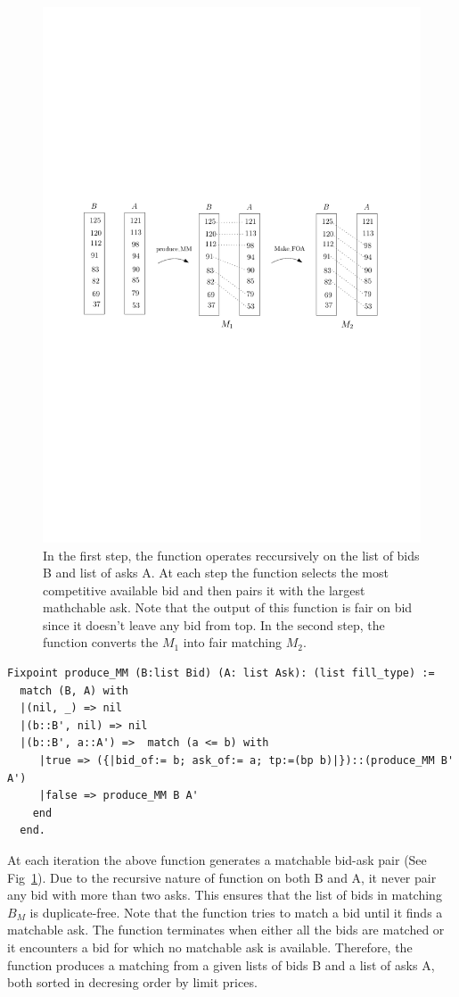 \documentclass[a4paper,UKenglish,cleveref, autoref]{lipics-v2019}
\begin{document}
\begin{figure}[h!]
\centering
\includegraphics[width=.8\textwidth]{MM.pdf}
\caption{In the first step, the function  operates reccursively on the list of bids B and list of asks A. At each step the function  selects the most competitive available bid and then pairs it with the largest mathchable ask. Note that the output of this function is fair on bid since it doesn't leave any bid from top. In the second step, the function  converts the $M_1$ into fair matching $M_2$. }
\label{fig:mm}
\end{figure}

\begin{verbatim}
Fixpoint produce_MM (B:list Bid) (A: list Ask): (list fill_type) :=
  match (B, A) with
  |(nil, _) => nil
  |(b::B', nil) => nil              
  |(b::B', a::A') =>  match (a <= b) with
     |true => ({|bid_of:= b; ask_of:= a; tp:=(bp b)|})::(produce_MM B' A')
     |false => produce_MM B A'
    end
  end. 
\end{verbatim}

At each iteration the above function generates a matchable bid-ask pair (See Fig~\ref{fig:mm}). Due to the recursive nature of  function   on both B and A, it never pair any bid with more than two asks. This ensures that the list of bids in matching $B_M$ is duplicate-free. Note that the function  tries to match a bid until it finds a matchable ask. The function terminates when either all the bids are matched or it encounters a bid for which no matchable ask is available.  Therefore, the function  produces a matching from a given lists of bids B and a list of asks A, both sorted in decresing order by limit prices.  
\end{document}
